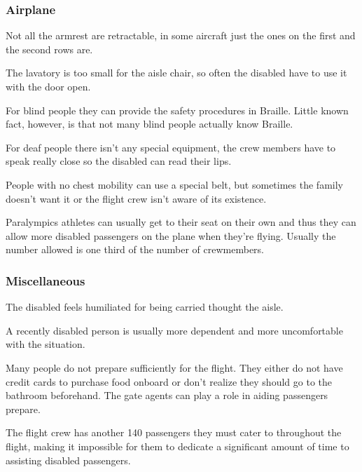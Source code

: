 \subsubsection{Airplane}
\begin{list}{-}{}
  \item Not all the armrest are retractable, in some aircraft just the ones on the first and the second rows are.
  \item The lavatory is too small for the aisle chair, so often the disabled have to use it with the door open.
  \item For blind people they can provide the safety procedures in Braille. Little known fact, however, is that not many blind people actually know Braille.
  \item For deaf people there isn’t any special equipment, the crew members have to speak really close so the disabled can read their lips. 
  \item People with no chest mobility can use a special belt, but sometimes the family doesn’t want it or the flight crew isn’t aware of its existence.
  \item Paralympics athletes can usually get to their seat on their own and thus they can allow more disabled passengers on the plane when they’re flying. Usually the number allowed is one third of the number of crewmembers.
\end{list}

\subsubsection{Miscellaneous}
\begin{list}{-}{}
  \item The disabled feels humiliated for being carried thought the aisle.
  \item A recently disabled person is usually more dependent and more uncomfortable with the situation.
  \item Many people do not prepare sufficiently for the flight. They either do not have credit cards to purchase food onboard or don’t realize they should go to the bathroom beforehand. The gate agents can play a role in aiding passengers prepare. 
  \item The flight crew has another 140 passengers they must cater to throughout the flight, making it impossible for them to dedicate a significant amount of time to assisting disabled passengers.
\end{list}

